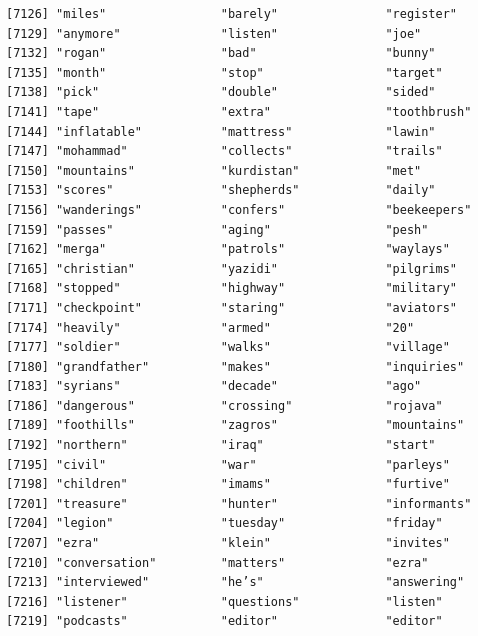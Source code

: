 \documentclass[
  letterpaper,
  DIV=11,
  numbers=noendperiod]{scrartcl}
\begin{document}
\begin{verbatim}
[7126] "miles"                "barely"               "register"            
[7129] "anymore"              "listen"               "joe"                 
[7132] "rogan"                "bad"                  "bunny"               
[7135] "month"                "stop"                 "target"              
[7138] "pick"                 "double"               "sided"               
[7141] "tape"                 "extra"                "toothbrush"          
[7144] "inflatable"           "mattress"             "lawin"               
[7147] "mohammad"             "collects"             "trails"              
[7150] "mountains"            "kurdistan"            "met"                 
[7153] "scores"               "shepherds"            "daily"               
[7156] "wanderings"           "confers"              "beekeepers"          
[7159] "passes"               "aging"                "pesh"                
[7162] "merga"                "patrols"              "waylays"             
[7165] "christian"            "yazidi"               "pilgrims"            
[7168] "stopped"              "highway"              "military"            
[7171] "checkpoint"           "staring"              "aviators"            
[7174] "heavily"              "armed"                "20"                  
[7177] "soldier"              "walks"                "village"             
[7180] "grandfather"          "makes"                "inquiries"           
[7183] "syrians"              "decade"               "ago"                 
[7186] "dangerous"            "crossing"             "rojava"              
[7189] "foothills"            "zagros"               "mountains"           
[7192] "northern"             "iraq"                 "start"               
[7195] "civil"                "war"                  "parleys"             
[7198] "children"             "imams"                "furtive"             
[7201] "treasure"             "hunter"               "informants"          
[7204] "legion"               "tuesday"              "friday"              
[7207] "ezra"                 "klein"                "invites"             
[7210] "conversation"         "matters"              "ezra"                
[7213] "interviewed"          "he’s"                 "answering"           
[7216] "listener"             "questions"            "listen"              
[7219] "podcasts"             "editor"               "editor"              
\end{verbatim}
\end{document}
